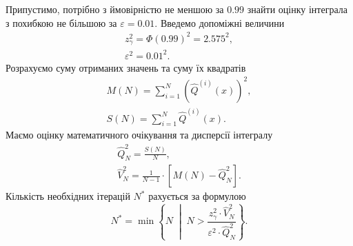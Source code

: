 Припустимо,
потрібно з ймовірністю не меншою за $0.99$
знайти оцінку інтеграла з похибкою не більшою за $\varepsilon = 0.01$.
Введемо допоміжні величини
\begin{equation*}
  \begin{split}
    z^2_{\gamma} = \Phi\left( 0.99 \right)^2 = 2.575^2, \\
    \varepsilon^2 = 0.01^2.
  \end{split}
\end{equation*}
Розрахуємо суму отриманих значень та суму їх квадратів
\begin{equation*}
  \begin{split}
    M\left( N \right) = \sum_{i=1}^{N} \left(
        \hat{Q}^{\left( i \right)}\left( x \right)
      \right)^2, \\
    S\left( N \right) = \sum_{i=1}^{N}
        \hat{Q}^{\left( i \right)}\left( x \right).
  \end{split}
\end{equation*}
Маємо оцінку математичного очікування та дисперсії інтегралу
\begin{equation*}
  \begin{split}
    \hat{Q}^2_N = \frac{S\left( N \right)}{N}, \\
    \hat{V}^2_N = \frac{1}{N-1}
      \cdot \left[ M\left( N \right) - \hat{Q}^2_N \right].
  \end{split}
\end{equation*}
Кількість необхідних ітерацій $N^*$ рахується за формулою
\begin{equation*}
  N^* = \min{\left\{ N \;\middle|\;
    N > \frac{z^2_{\gamma} \cdot \hat{V}^2_N}
    {\varepsilon^2 \cdot \hat{Q}^2_N} \right\}}.
\end{equation*}
